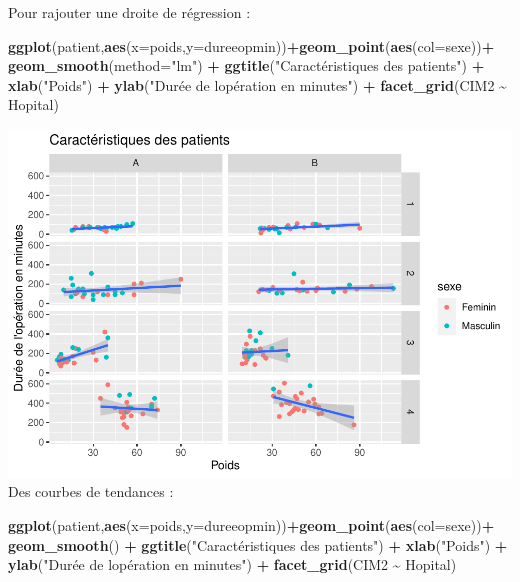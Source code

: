 \documentclass[
]{book}
\newenvironment{Shaded}{\begin{snugshade}}{\end{snugshade}}
\newcommand{\AttributeTok}[1]{\textcolor[rgb]{0.13,0.29,0.53}{#1}}
\newcommand{\FunctionTok}[1]{\textcolor[rgb]{0.13,0.29,0.53}{\textbf{#1}}}
\newcommand{\NormalTok}[1]{#1}
\newcommand{\SpecialCharTok}[1]{\textcolor[rgb]{0.81,0.36,0.00}{\textbf{#1}}}
\newcommand{\StringTok}[1]{\textcolor[rgb]{0.31,0.60,0.02}{#1}}
\begin{document}
Pour rajouter une droite de régression :

\begin{Shaded}
\begin{Highlighting}[]
\FunctionTok{ggplot}\NormalTok{(patient,}\FunctionTok{aes}\NormalTok{(}\AttributeTok{x=}\NormalTok{poids,}\AttributeTok{y=}\NormalTok{dureeopmin))}\SpecialCharTok{+}\FunctionTok{geom\_point}\NormalTok{(}\FunctionTok{aes}\NormalTok{(}\AttributeTok{col=}\NormalTok{sexe))}\SpecialCharTok{+}
  \FunctionTok{geom\_smooth}\NormalTok{(}\AttributeTok{method=}\StringTok{"lm"}\NormalTok{) }\SpecialCharTok{+}
  \FunctionTok{ggtitle}\NormalTok{(}\StringTok{"Caractéristiques des patients"}\NormalTok{) }\SpecialCharTok{+} 
  \FunctionTok{xlab}\NormalTok{(}\StringTok{"Poids"}\NormalTok{) }\SpecialCharTok{+} 
  \FunctionTok{ylab}\NormalTok{(}\StringTok{"Durée de l\textquotesingle{}opération en minutes"}\NormalTok{) }\SpecialCharTok{+}
  \FunctionTok{facet\_grid}\NormalTok{(CIM2 }\SpecialCharTok{\textasciitilde{}}\NormalTok{ Hopital)}
\end{Highlighting}
\end{Shaded}

\includegraphics{_main_files/figure-latex/ggplot17a-1.pdf}
Des courbes de tendances :

\begin{Shaded}
\begin{Highlighting}[]
\FunctionTok{ggplot}\NormalTok{(patient,}\FunctionTok{aes}\NormalTok{(}\AttributeTok{x=}\NormalTok{poids,}\AttributeTok{y=}\NormalTok{dureeopmin))}\SpecialCharTok{+}\FunctionTok{geom\_point}\NormalTok{(}\FunctionTok{aes}\NormalTok{(}\AttributeTok{col=}\NormalTok{sexe))}\SpecialCharTok{+}
  \FunctionTok{geom\_smooth}\NormalTok{() }\SpecialCharTok{+}
  \FunctionTok{ggtitle}\NormalTok{(}\StringTok{"Caractéristiques des patients"}\NormalTok{) }\SpecialCharTok{+} 
  \FunctionTok{xlab}\NormalTok{(}\StringTok{"Poids"}\NormalTok{) }\SpecialCharTok{+} 
  \FunctionTok{ylab}\NormalTok{(}\StringTok{"Durée de l\textquotesingle{}opération en minutes"}\NormalTok{) }\SpecialCharTok{+}
  \FunctionTok{facet\_grid}\NormalTok{(CIM2 }\SpecialCharTok{\textasciitilde{}}\NormalTok{ Hopital)}
\end{Highlighting}
\end{Shaded}
\end{document}
